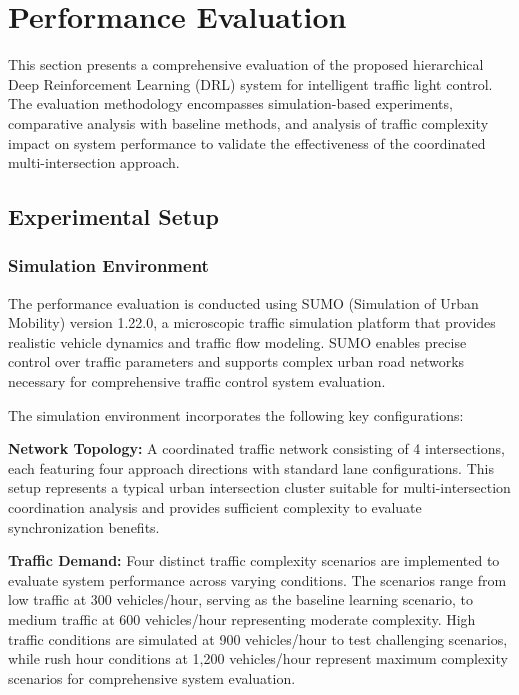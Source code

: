\section{Performance Evaluation}\label{sec2b}

This section presents a comprehensive evaluation of the proposed hierarchical Deep Reinforcement 
Learning (DRL) system for intelligent traffic light control. The evaluation methodology encompasses 
simulation-based experiments, comparative analysis with baseline methods, and analysis of traffic 
complexity impact on system performance to validate the effectiveness of the coordinated 
multi-intersection approach.

\subsection{Experimental Setup}\label{subsec2b-1}

\subsubsection{Simulation Environment}

The performance evaluation is conducted using SUMO (Simulation of Urban Mobility) version 1.22.0, 
a microscopic traffic simulation platform that provides realistic vehicle dynamics and traffic flow 
modeling. SUMO enables precise control over traffic parameters and supports complex urban road 
networks necessary for comprehensive traffic control system evaluation.

The simulation environment incorporates the following key configurations:

\textbf{Network Topology:} A coordinated traffic network consisting of 4 intersections, each 
featuring four approach directions with standard lane configurations. This setup represents a 
typical urban intersection cluster suitable for multi-intersection coordination analysis and provides 
sufficient complexity to evaluate synchronization benefits.

\textbf{Traffic Demand:} Four distinct traffic complexity scenarios are implemented to evaluate 
system performance across varying conditions. The scenarios range from low traffic at 300 vehicles/hour, 
serving as the baseline learning scenario, to medium traffic at 600 vehicles/hour representing 
moderate complexity. High traffic conditions are simulated at 900 vehicles/hour to test challenging 
scenarios, while rush hour conditions at 1,200 vehicles/hour represent maximum complexity scenarios 
for comprehensive system evaluation.

